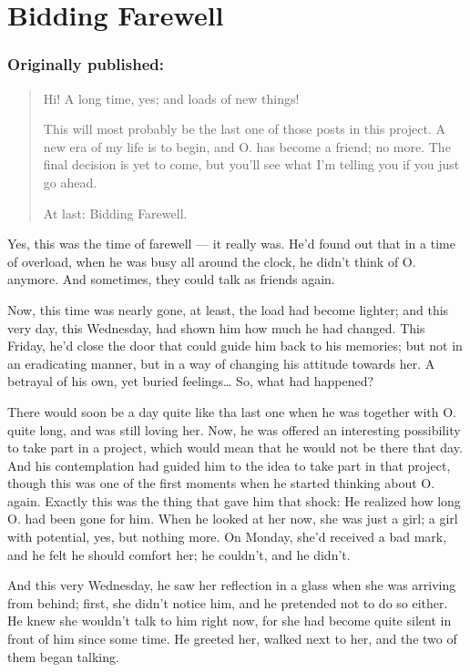 \chapter{Bidding Farewell}
\label{cha:bidding-farewell}
\subsection*{Originally published: }
\begin{quote}
Hi! A long time, yes; and loads of new things!

This will most probably be the last one of those posts in this project. A new era of my life is to begin, and O. has become a friend; no more. The final decision is yet to come, but you'll see what I'm telling you if you just go ahead. 

At last: Bidding Farewell.
\end{quote}

Yes, this was the time of farewell --- it really was. He'd found out that in a time of overload, when he was busy all around the clock, he didn't think of O. anymore.
And sometimes, they could talk as friends again.

Now, this time was nearly gone, at least, the load had become lighter; and this very day, this Wednesday, had shown him how much he had changed. 
This Friday, he'd close the door that could guide him back to his memories; but not in an eradicating manner, but in a way of changing his attitude towards her. A betrayal of his own, yet buried feelings\dots{}
So, what had happened?

There would soon be a day quite like tha last one when he was together with O. quite long, and was still loving her. Now, he was offered an interesting possibility to take part in a project, which would mean that he would not be there that day. And his contemplation had guided him to the idea to take part in that project, though this was one of the first moments when he started thinking about O. again. Exactly this was the thing that gave him that shock: He realized how long O. had been gone for him. When he looked at her now, she was just a girl; a girl with potential, yes, but nothing more. 
On Monday, she'd received a bad mark, and he felt he should comfort her; he couldn't, and he didn't.

And this very Wednesday, he saw her reflection in a glass when she was arriving from behind; first, she didn't notice him, and he pretended not to do so either. 
He knew she wouldn't talk to him right now, for she had become quite silent in front of him since some time.
He greeted her, walked next to her, and the two of them began talking.

